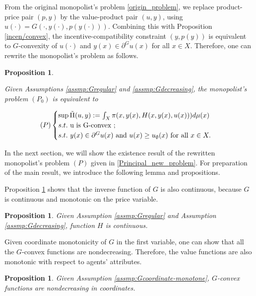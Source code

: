 \documentclass[a4paper, 11pt]{amsart}
\numberwithin{equation}{section}
\theoremstyle{plain}
\newtheorem{proposition}[theorem]{Proposition}
\theoremstyle{definition}
\theoremstyle{remark}
\begin{document}
From the original monopolist's problem \eqref{origin_problem}, we replace product-price pair $(p,y)$ by the value-product pair $(u,y)$, using $u(\cdot) = G(\cdot, y(\cdot), p(y(\cdot)))$. %
Combining this with Proposition \ref{incen/convex}, the incentive-compatibility constraint $(y,p(y))$ is equivalent to $G$-convexity of $u(\cdot)$ and $y(x) \in \partial^G u(x)$ for all $x\in X$. Therefore, one can rewrite the monopolist's problem as follows.

\begin{proposition}\label{equiv_form}
	
	Given Assumptions \ref{assmp:Gregular} and \ref{assmp:Gdecreasing}, the monopolist's problem $(P_0)$ is equivalent to
	
	\begin{equation}\label{Principal_new_problem}
	(P)
	\begin{cases}
	\sup \tilde{\Pi}(u,y):=\int_{X} \pi(x, y(x), H(x,y(x), u(x))) d\mu(x)\\
	s.t.\ $u$ \text{ is } $G$\text{-convex };\\
	s.t.\ y(x) \in \partial^G u(x) \text{ and }u(x)\ge u_{\emptyset}(x) \text{ for all } x \in X.
	\end{cases}
	\end{equation}
\end{proposition}

\medskip
In the next section, we will show the existence result of the rewritten monopolist's problem $(P)$ given in \eqref{Principal_new_problem}. For preparation of the main result, we introduce the following lemma and propositions.\medskip

Proposition \ref{lemma_continuity} shows that the inverse function of $G$ is also continuous, because $G$ is continuous and monotonic on the price variable. \medskip

\begin{proposition}\label{lemma_continuity}
	Given Assumption \ref{assmp:Gregular} and Assumption \ref{assmp:Gdecreasing}, function $H$ is continuous.
\end{proposition}

Given coordinate monotonicity of $G$ in the first variable, one can show that all the $G$-convex functions are nondecreasing. Therefore, the value functions are also monotonic with respect to agents' attributes. \medskip

\begin{proposition}\label{nondecreasing}
	Given Assumption \ref{assmp:Gcoordinate-monotone}, $G$-convex functions are nondecreasing in coordinates.
\end{proposition}
\end{document}
